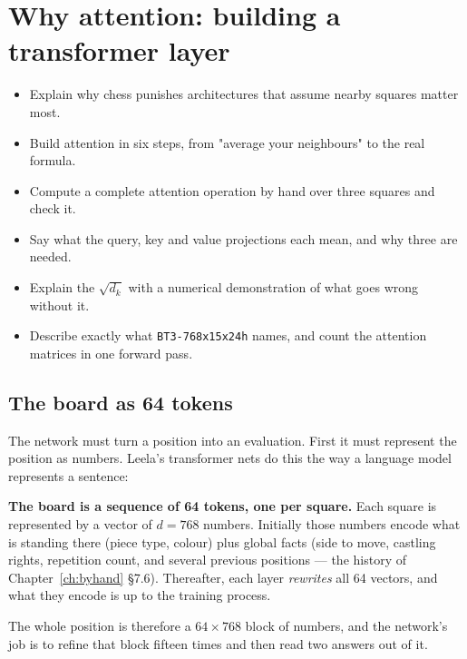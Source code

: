 \chapter{Why attention: building a transformer layer}
\label{ch:attention}

\begin{objectives}
\begin{itemize}
\item Explain why chess punishes architectures that assume nearby squares matter most.
\item Build attention in six steps, from "average your neighbours" to the real formula.
\item Compute a complete attention operation by hand over three squares and check it.
\item Say what the query, key and value projections each mean, and why three are needed.
\item Explain the $\sqrt{d_k}$ with a numerical demonstration of what goes wrong without it.
\item Describe exactly what \texttt{BT3-768x15x24h} names, and count the attention matrices in
  one forward pass.
\end{itemize}
\end{objectives}

\section{The board as 64 tokens}

The network must turn a position into an evaluation. First it must represent the position as
numbers. Leela's transformer nets do this the way a language model represents a sentence:

\begin{keyidea}
\textbf{The board is a sequence of 64 tokens, one per square.} Each square is represented by
a vector of $d = 768$ numbers. Initially those numbers encode what is standing there (piece
type, colour) plus global facts (side to move, castling rights, repetition count, and several
previous positions --- the history of Chapter~\ref{ch:byhand} §7.6). Thereafter, each layer
\emph{rewrites} all 64 vectors, and what they encode is up to the training process.
\end{keyidea}

The whole position is therefore a $64 \times 768$ block of numbers, and the network's job is
to refine that block fifteen times and then read two answers out of it.

